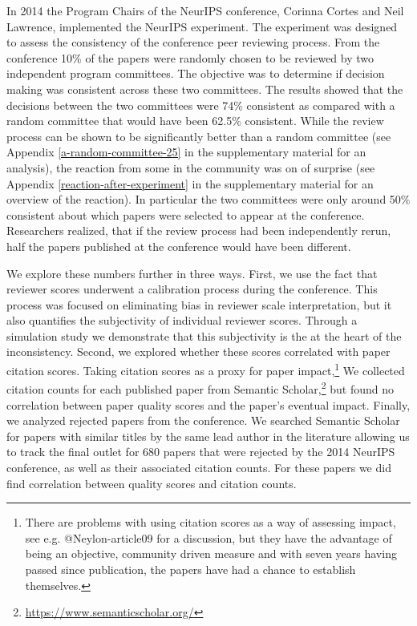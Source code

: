 \documentclass[twoside]{article}
\begin{document}
In 2014 the Program Chairs of the NeurIPS conference, Corinna Cortes
and Neil Lawrence, implemented the NeurIPS experiment. The experiment
was designed to assess the consistency of the conference peer
reviewing process. From the conference 10\% of the papers were
randomly chosen to be reviewed by two independent program
committees. The objective was to determine if decision making was
consistent across these two committees.  The results showed that the
decisions between the two committees were 74\% consistent as compared
with a random committee that would have been 62.5\% consistent. While
the review process can be shown to be significantly better than a
random committee (see Appendix \ref{a-random-committee-25} in the
supplementary material for an analysis), the reaction from some in the
community was on of surprise (see Appendix
\ref{reaction-after-experiment} in the supplementary material for an
overview of the reaction). In particular the two committees were only
around 50\% consistent about which papers were selected to appear at
the conference. Researchers realized, that if the review process had
been independently rerun, half the papers published at the conference
would have been different.

We explore these numbers further in three ways. First, we use the fact
that reviewer scores underwent a calibration process during the
conference. This process was focused on eliminating bias in reviewer
scale interpretation, but it also quantifies the subjectivity of
individual reviewer scores. Through a simulation study we demonstrate
that this subjectivity is the at the heart of the inconsistency. Second,
we explored whether these scores correlated with paper citation scores.
Taking citation scores as a proxy for paper impact,\footnote{There are
  problems with using citation scores as a way of assessing impact, see
  e.g. @Neylon-article09 for a discussion, but they have the advantage
  of being an objective, community driven measure and with seven years
  having passed since publication, the papers have had a chance to
  establish themselves.} We collected citation counts for each published
paper from Semantic Scholar,\footnote{\url{https://www.semanticscholar.org/}}
but found no correlation between paper quality scores and the paper's
eventual impact. Finally, we analyzed rejected papers from the
conference. We searched Semantic Scholar for papers with similar titles
by the same lead author in the literature allowing us to track the final
outlet for 680 papers that were rejected by the 2014 NeurIPS conference,
as well as their associated citation counts. For these papers we did
find correlation between quality scores and citation counts.
\end{document}
